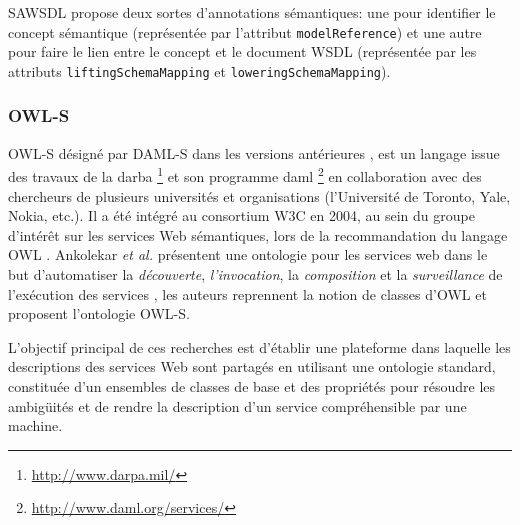       \textsc{SAWSDL} propose deux sortes d'annotations sémantiques: une
      pour identifier le concept sémantique (représentée par l'attribut
      \texttt{modelReference}) et une autre pour faire le lien entre le
      concept et le document \textsc{WSDL} (représentée par les attributs
      \texttt{liftingSchemaMapping} et \texttt{loweringSchemaMapping}).


      \subsubsection{OWL-S}

      \textsc{OWL-S} \cite{martin2004owl} désigné par \textsc{DAML-S} dans
      les versions antérieures \cite{ankolekar2002daml}, est un langage
      issue des travaux de la \acrshort{darba}
      \footnote{\url{http://www.darpa.mil/}} et son programme
      \acrshort{daml} \footnote{\url{http://www.daml.org/services/}} en
      collaboration avec des chercheurs de plusieurs universités et
      organisations (l'Université de Toronto, Yale, Nokia, etc.). Il a été
      intégré au consortium \textsc{W3C} en 2004, au sein du groupe
      d'intérêt sur les services Web sémantiques, lors de la recommandation
      du langage \textsc{OWL} \cite{horrocks2002daml+oil}
      \cite{mcguinness2004owl}.  Ankolekar \emph{et al.}
      \cite{ankolekar2002daml} présentent une ontologie pour les services
      web dans le but d'automatiser la \emph{découverte},
      \emph{l'invocation}, la \emph{composition} et la \emph{surveillance}
      de l'exécution des services \cite{mcilraith2003bringing}, les auteurs
      reprennent la notion de classes d'\textsc{OWL} et proposent
      l'ontologie \textsc{OWL-S}.


      L'objectif principal de ces recherches est d'établir une plateforme
      dans laquelle les descriptions des services Web sont partagés en
      utilisant une ontologie standard, constituée d'un ensembles de classes
      de base et des propriétés pour résoudre les ambigüités et de rendre la
      description d'un service compréhensible par une machine.

